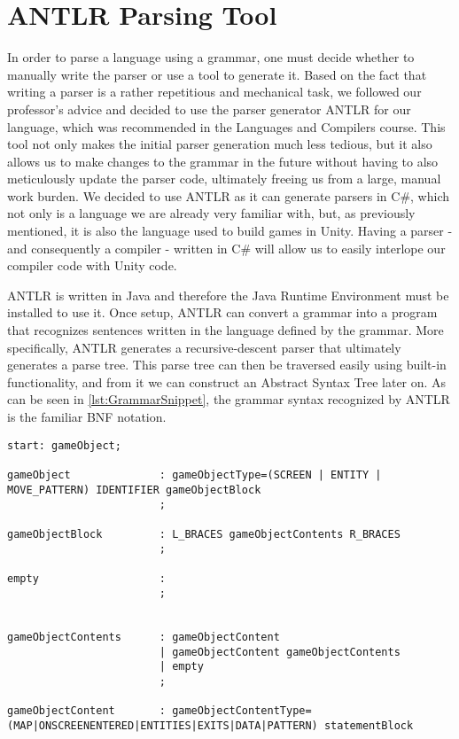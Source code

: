 \section{ANTLR Parsing Tool}\label{sec:ANTLRTool}
In order to parse a language using a grammar, one must decide whether to manually write the parser or use a tool to generate it\cite{crafting_a_compiler}.
Based on the fact that writing a parser is a rather repetitious and mechanical task, we followed our professor's advice and decided to use the parser generator ANTLR for our language, which was recommended in the Languages and Compilers course. 
This tool not only makes the initial parser generation much less tedious, but it also allows us to make changes to the grammar in the future without having to also meticulously update the parser code, ultimately freeing us from a large, manual work burden.
We decided to use ANTLR as it can generate parsers in C\#, which not only is a language we are already very familiar with, but, as previously mentioned, it is also the language used to build games in Unity. Having a parser - and consequently a compiler - written in C\# will allow us to easily interlope our compiler code with Unity code.


ANTLR is written in Java and therefore the Java Runtime Environment must be installed to use it. 
Once setup, ANTLR can convert a grammar into a program that recognizes sentences written in the language defined by the grammar.
More specifically, ANTLR generates a recursive-descent parser that ultimately generates a parse tree.
This parse tree can then be traversed easily using built-in functionality, and from it we can construct an Abstract Syntax Tree later on.
As can be seen in \ref{lst:GrammarSnippet}, the grammar syntax recognized by ANTLR is the familiar BNF notation.


\begin{lstlisting}[caption={A snippet of the \dazel{} grammar used by ANTLR to generate the parser}, label={lst:GrammarSnippet}]
start: gameObject;

gameObject              : gameObjectType=(SCREEN | ENTITY | MOVE_PATTERN) IDENTIFIER gameObjectBlock
						;
						
gameObjectBlock         : L_BRACES gameObjectContents R_BRACES
						;

empty                   : 
						;


gameObjectContents      : gameObjectContent
						| gameObjectContent gameObjectContents
						| empty
						;

gameObjectContent       : gameObjectContentType=(MAP|ONSCREENENTERED|ENTITIES|EXITS|DATA|PATTERN) statementBlock 
\end{lstlisting}

